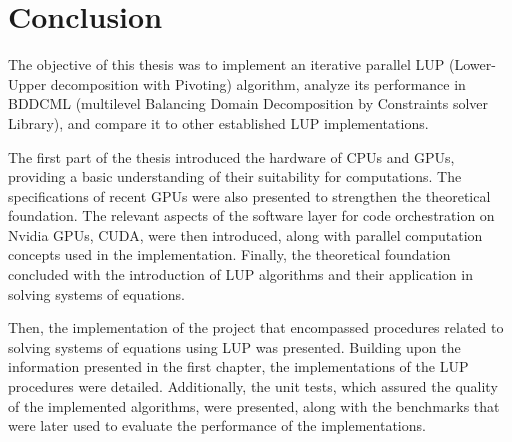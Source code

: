 \chapter*{Conclusion}				   	   %

The objective of this thesis was to implement an iterative parallel LUP (Lower-Upper decomposition with Pivoting) algorithm, analyze its performance in BDDCML (multilevel Balancing Domain Decomposition by Constraints solver Library), and compare it to other established LUP implementations.

The first part of the thesis introduced the hardware of CPUs and GPUs, providing a basic understanding of their suitability for computations. The specifications of recent GPUs were also presented to strengthen the theoretical foundation. The relevant aspects of the software layer for code orchestration on Nvidia GPUs, CUDA, were then introduced, along with parallel computation concepts used in the implementation. Finally, the theoretical foundation concluded with the introduction of LUP algorithms and their application in solving systems of equations.

Then, the implementation of the project that encompassed procedures related to solving systems of equations using LUP was presented. Building upon the information presented in the first chapter, the implementations of the LUP procedures were detailed. Additionally, the unit tests, which assured the quality of the implemented algorithms, were presented, along with the benchmarks that were later used to evaluate the performance of the implementations.

